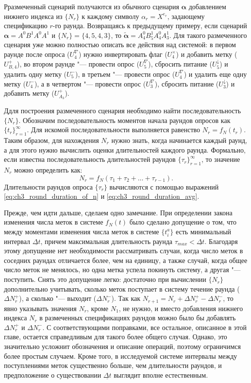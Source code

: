 Рразмеченный сценарий получаются из обычного сценария $\bm{\alpha}$ добавлением нижнего индекса из $\{ N_r \}$ к каждому символу $\alpha_r = X^{e_r}$, задающему спецификацию $r$-го раунда. Возвращаясь к предыдущему примеру, если сценарий $\bm{\alpha} = A^0 B^1 A^0 A^1$ и $\{ N_r \} = \{ 4, 5, 4, 3 \}$, то $\widetilde{\bm{\alpha}} = A^0_4 B^1_5 A^0_4 A^1_3$. Для такого размеченного сценария уже можно полностью описать все действия над системой: в первом раунде после опроса ($U_4^\nabla$) нужно инвертировать флаг ($U_4^\times$) и добавить метку ($U_{B,4}^+$), во втором раунде "--- провести опрос ($U_5^\nabla$), сбросить питание ($U_5^\downarrow$) и удалить одну метку ($U_5^-$), в третьем "--- провести опрос ($U_4^\nabla$) и удалить еще одну метку ($U_4^-$), а в четвертом "--- провести опрос ($U_3^\nabla$), сбросить питание ($U_3^\downarrow$) и добавить метку ($U_{A_3}^+$).

Ддля построения размеченного сценария необходимо найти последовательность $\{ N_r \}$. Обозначим последовательность моментов начала раундов опросов как $\{ t_r \}_{r=1}^\infty$. Для искомой последовательности выполняется равенство $N_r = f_N(t_r)$. Таким образом, для нахождения $N_r$ нужно знать, когда начинается каждый раунд, а для этого нужно вычислить оценки длительностей каждого раунда. Формально, если известна последовательность длительностей раундов $\{ \tau_r \}_{r=1}^\infty$, то значение $N_r$ можно определить как:
$$
N_r = f_N(\tau_1 + \tau_2 + \dots + \tau_{r-1}).
$$
Длительности раундов опроса $\{ \tau_r \}$ вычисляются с помощью выражений \eqref{eq:ch3_round_duration_of_n} и \eqref{eq:ch3_round_duration_avg}.

Прежде, чем идти дальше, сделаем одно замечание. При определении закона изменения числа меток в системе $f_N(t)$ было сделано допущение о том, что между моментами изменения числа меток в системе $\{ t_i^a \}$ есть минимальный интервал $\underline{\Delta t}$, причем максимальная длительность раунда $\tau_{max} < \underline{\Delta t}$. Благодаря этому допущение нет необходимости рассматривать случаи, когда число меток в соседних раундах отличается более, чем на единицу, а также случай, когда общее число меток не менялось, но одна метка успела покинуть систему, а другая "--- поступить. Снять это допущение легко: достаточно при вычислении $\{ N_r \}$ дополнительно учитывать, сколько меток поступает в систему течение раунда ($\Delta N_r^+$), а сколько "--- выходит ($\Delta N_r^-$). Так как $N_{r+1} = N_r + \Delta N_r^+ - \Delta N_r^-$, то явно указывать значения $N_r$, кроме $N_1$, не нужно, и вместо добавления нижнего индекса $N_r$ в размеченных спецификациях раундов можно было бы добавлять $\Delta N_r^+$ и $\Delta N_r^-$. С соответствующими поправками, все остальное, описанное в этой главе, остается справедливым для такого более общего случая. Однако, это значительно усложнит обозначения и описание операций, поэтому ограничимся более простым случаем. Кроме того, в исследуемой системе интервалы между поступлениями меток существенно больше, чем длительности раундов, и предположение о существовании $\underline{\Delta t}$ выглядит вполне естественным.

